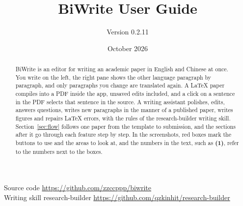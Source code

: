 \documentclass[a4paper,11pt]{article}
\title{\textbf{BiWrite User Guide}}
\author{Version 0.2.11}
\date{October 2026}
\newcommand{\n}[1]{\textbf{(#1)}}
\begin{document}
\maketitle
\thispagestyle{empty}

\begin{center}
Source code \url{https://github.com/zzccppp/biwrite}\\[2pt]
Writing skill research-builder \url{https://github.com/qzkinhit/research-builder}
\end{center}

\begin{abstract}
BiWrite is an editor for writing an academic paper in English and Chinese at once. You write on the left, the right pane shows the other language paragraph by paragraph, and only paragraphs you change are translated again. A LaTeX paper compiles into a PDF inside the app, unsaved edits included, and a click on a sentence in the PDF selects that sentence in the source. A writing assistant polishes, edits, answers questions, writes new paragraphs in the manner of a published paper, writes figures and repairs LaTeX errors, with the rules of the research-builder writing skill. Section~\ref{sec:flow} follows one paper from the template to submission, and the sections after it go through each feature step by step. In the screenshots, red boxes mark the buttons to use and the areas to look at, and the numbers in the text, such as \n{1}, refer to the numbers next to the boxes.
\end{abstract}
\end{document}
